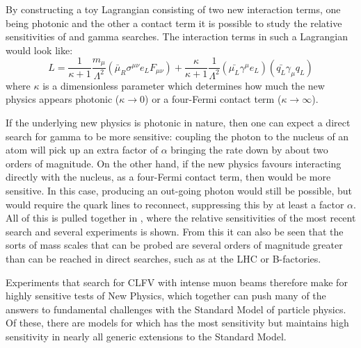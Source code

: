 By constructing a toy Lagrangian consisting of two new interaction terms, one being photonic and the other a contact term it is possible to study the relative sensitivities of \mueconv and \mutoe gamma searches.
The interaction terms in such a Lagrangian would look like:
\begin{equation}
L=\frac{1}{\kappa+1}\frac{m_\mu}{\Lambda^2}\left(\bar{\mu}_R\sigma^{\mu\nu}e_LF_{\mu\nu}\right)+\frac{\kappa}{\kappa+1}\frac{1}{\Lambda^2}\left(\bar{\mu_L}\gamma^\mu e_L\right)\left(\bar{q_L}\gamma_\mu q_L\right)
\end{equation}
where $\kappa$ is a dimensionless parameter which determines how much the new physics appears photonic ($\kappa\rightarrow0$) or a four-Fermi contact term ($\kappa\rightarrow\infty$).

If the underlying new physics is photonic in nature, then one can expect a direct search for \mutoe gamma to be more sensitive: coupling the photon to the nucleus of an atom will pick up an extra factor of $\alpha$ bringing the rate down by about two orders of magnitude.
On the other hand, if the new physics favours interacting directly with the nucleus, as a four-Fermi contact term, then \mueconv would be more sensitive. 
In this case, producing an out-going photon would still be possible, but would require the quark lines to reconnect, suppressing this by at least a factor $\alpha$.
All of this is pulled together in , where the relative sensitivities of the most recent \muegamma search and several \mueconv experiments is shown.
From this it can also be seen that the sorts of mass scales that can be probed are several orders of magnitude greater than can be reached in direct searches, such as at the LHC or B-factories.

Experiments that search for \ac{CLFV} with intense muon beams therefore make for highly sensitive tests of New Physics, which together can push many of the answers to fundamental challenges with the Standard Model of particle physics.
Of these, there are models for which \mueconv has the most sensitivity but maintains high sensitivity in nearly all generic extensions to the Standard Model.
